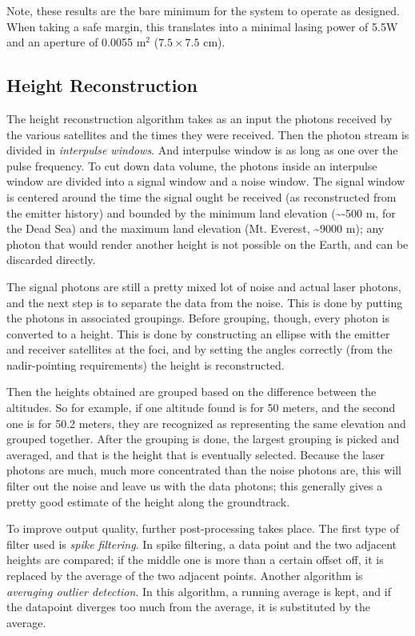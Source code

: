 Note, these results are the bare minimum for the system to operate as designed. When taking a safe margin, this translates into a minimal lasing power of 5.5W and an aperture of 0.0055 m$^2$ ($7.5\times7.5$ cm). 

\subsection{Height Reconstruction}
\label{sec:HeightReconstruction}

The height reconstruction algorithm takes as an input the photons received by the various satellites and the times they were received. Then the photon stream is divided in \emph{interpulse windows}. And interpulse window is as long as one over the pulse frequency. To cut down data volume, the photons inside an interpulse window are divided into a signal window and a noise window. The signal window is centered around the time the signal ought be received (as reconstructed from the emitter history) and bounded by the minimum land elevation (\sim -500 m, for the Dead Sea) and the maximum land elevation (Mt. Everest, \sim 9000 m); any photon that would render another height is not possible on the Earth, and can be discarded directly.

The signal photons are still a pretty mixed lot of noise and actual laser photons, and the next step is to separate the data from the noise. This is done by putting the photons in associated groupings. Before grouping, though, every photon is converted to a height. This is done by constructing an ellipse with the emitter and receiver satellites at the foci, and by setting the angles correctly (from the nadir-pointing requirements) the height is reconstructed.

Then the heights obtained are grouped based on the difference between the altitudes. So for example, if one altitude found is for 50 meters, and the second one is for 50.2 meters, they are recognized as representing the same elevation and grouped together. After the grouping is done, the largest grouping is picked and averaged, and that is the height that is eventually selected. Because the laser photons are much, much more concentrated than the noise photons are, this will filter out the noise and leave us with the data photons; this generally gives a pretty good estimate of the height along the groundtrack.

To improve output quality, further post-processing takes place. The first type of filter used is \emph{spike filtering}. In spike filtering, a data point and the two adjacent heights are compared; if the middle one is more than a certain offset off, it is replaced by the average of the two adjacent points. Another algorithm is \emph{averaging outlier detection}. In this algorithm, a running average is kept, and if the datapoint diverges too much from the average, it is substituted by the average.

